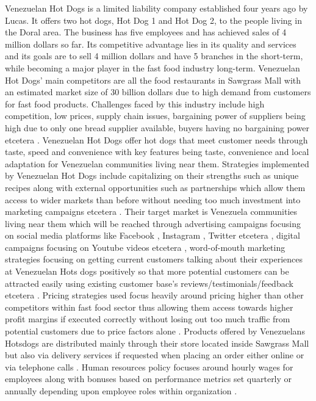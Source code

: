

Venezuelan Hot Dogs is a limited liability company established four years ago by Lucas. It offers two hot dogs, Hot Dog 1 and Hot Dog 2, to the people living in the Doral area. The business has five employees and has achieved sales of 4 million dollars so far. Its competitive advantage lies in its quality and services and its goals are to sell 4 million dollars and have 5 branches in the short-term, while becoming a major player in the fast food industry long-term. Venezuelan Hot Dogs' main competitors are all the food restaurants in Sawgrass Mall with an estimated market size of 30 billion dollars due to high demand from customers for fast food products. Challenges faced by this industry include high competition, low prices, supply chain issues, bargaining power of suppliers being high due to only one bread supplier available, buyers having no bargaining power etcetera . Venezuelan Hot Dogs offer hot dogs that meet customer needs through taste, speed and convenience with key features being taste, convenience and local adaptation for Venezuelan communities living near them. Strategies implemented by Venezuelan Hot Dogs include capitalizing on their strengths such as unique recipes along with external opportunities such as partnerships which allow them access to wider markets than before without needing too much investment into marketing campaigns etcetera . Their target market is Venezuela communities living near them which will be reached through advertising campaigns focusing on social media platforms like Facebook , Instagram , Twitter etcetera , digital campaigns focusing on Youtube videos etcetera , word-of-mouth marketing strategies focusing on getting current customers talking about their experiences at Venezuelan Hots dogs positively so that more potential customers can be attracted easily using existing customer base's reviews/testimonials/feedback etcetera . Pricing strategies used focus heavily around pricing higher than other competitors within fast food sector thus allowing them access towards higher profit margins if executed correctly without losing out too much traffic from potential customers due to price factors alone . Products offered by Venezuelans Hotsdogs are distributed mainly through their store located inside Sawgrass Mall but also via delivery services if requested when placing an order either online or via telephone calls . Human resources policy focuses around hourly wages for employees along with bonuses based on performance metrics set quarterly or annually depending upon employee roles within organization .